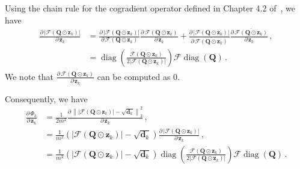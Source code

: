 \documentclass{article}
\numberwithin{equation}{section}
\begin{document}
Using the chain rule for the cogradient operator defined in Chapter 4.2 of~\cite{CRcalculus}, we have
\begin{equation*}
    \begin{aligned}
        \frac{\partial\,  |\mathcal{F}(\bm{Q}\odot\bm{z}_k)|}{\partial\,  \bm{z}_k}&= \frac{\partial\,  |\mathcal{F}(\bm{Q}\odot\bm{z}_k)|}{\partial\,  \mathcal{F}(\bm{Q}\odot\bm{z}_k)}\frac{\partial\,  \mathcal{F}(\bm{Q}\odot\bm{z}_k)}{\partial\,  \bm{z}_k} +  \frac{\partial\,  |\mathcal{F}(\bm{Q}\odot\bm{z}_k)|}{\partial\,  \overline{\mathcal{F}(\bm{Q}\odot\bm{z}_k)}}\frac{\partial\,  \overline{\mathcal{F}(\bm{Q}\odot\bm{z}_k)}}{\partial\,  \bm{z}_k}\,,\\
        &= \operatorname{diag}\left(\frac{\overline{\mathcal{F}(\bm{Q}\odot\bm{z}_k)}}{2|\mathcal{F}(\bm{Q}\odot\bm{z}_k)|}\right)\mathcal{F}\operatorname{diag}(\bm{Q})\,.
    \end{aligned}
\end{equation*}
We note that $\frac{\partial\,  \overline{\mathcal{F}(\bm{Q}\odot\bm{z}_k)}}{\partial\,  \bm{z}_k}$ can be computed as 0.

Consequently, we have
\begin{equation*}
    \begin{aligned}
        \frac{\partial\,  \Phi_{k}}{\partial\,  \bm{z}_k}  &= \frac{1}{2m^2}\frac{\partial\,  \left\||\mathcal{F}(\bm{Q}\odot\bm{z}_k)| -  \sqrt{\bm{d}_k}\right\|_2^2}{\partial\,  \bm{z}_k} \,,\\
        &= \frac{1}{m^2}\left(|\mathcal{F}(\bm{Q}\odot\bm{z}_k)|-\sqrt{\bm{d}_k}\right)\frac{\partial\,  |\mathcal{F}(\bm{Q}\odot\bm{z}_k)|}{\partial\,  \bm{z}_k}\,,\\ 
        &= \frac{1}{m^2}\left(|\mathcal{F}(\bm{Q}\odot\bm{z}_k)|-\sqrt{\bm{d}_k}\right)\operatorname{diag}\left(\frac{\overline{\mathcal{F}(\bm{Q}\odot\bm{z}_k)}}{2|\mathcal{F}(\bm{Q}\odot\bm{z}_k)|}\right)\mathcal{F}\operatorname{diag}(\bm{Q})\,.\\  
    \end{aligned}
\end{equation*}
\end{document}
